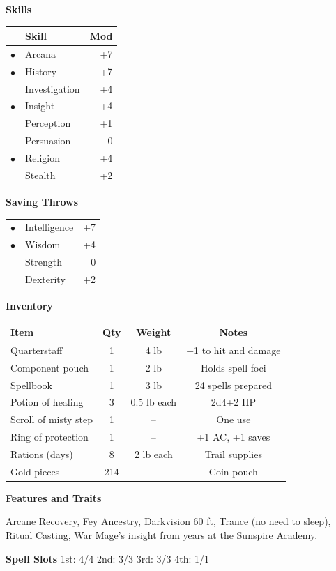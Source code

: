 \documentclass[9pt]{article}
\newcommand{\skillrow}[3]{#1 & #2 & #3 \\}
\begin{document}
\vspace{1.2em}
\noindent
\begin{minipage}[t]{0.36\textwidth}
{\large\bfseries\color{maroon} Skills}

\vspace{0.4em}
\begin{tabular}{@{}p{0.5cm}p{2.6cm}r@{}}
\toprule
& \textbf{Skill} & \textbf{Mod} \\
\midrule
\skillrow{$\bullet$}{Arcana}{+7}
\skillrow{$\bullet$}{History}{+7}
\skillrow{}{Investigation}{+4}
\skillrow{$\bullet$}{Insight}{+4}
\skillrow{}{Perception}{+1}
\skillrow{}{Persuasion}{0}
\skillrow{$\bullet$}{Religion}{+4}
\skillrow{}{Stealth}{+2}
\bottomrule
\end{tabular}

\vspace{0.8em}
{\large\bfseries\color{maroon} Saving Throws}

\vspace{0.4em}
\begin{tabular}{@{}p{0.5cm}p{2.6cm}r@{}}
\skillrow{$\bullet$}{Intelligence}{+7}
\skillrow{$\bullet$}{Wisdom}{+4}
\skillrow{}{Strength}{0}
\skillrow{}{Dexterity}{+2}
\end{tabular}
\end{minipage}%
\hfill
\begin{minipage}[t]{0.6\textwidth}
{\large\bfseries\color{maroon} Inventory}

\vspace{0.4em}
\begin{tabular}{@{}lccc@{}}
\toprule
\textbf{Item} & \textbf{Qty} & \textbf{Weight} & \textbf{Notes} \\
\midrule
Quarterstaff & 1 & 4 lb & +1 to hit and damage \\
Component pouch & 1 & 2 lb & Holds spell foci \\
Spellbook & 1 & 3 lb & 24 spells prepared \\
Potion of healing & 3 & 0.5 lb each & 2d4+2 HP \\
Scroll of misty step & 1 & -- & One use \\
Ring of protection & 1 & -- & +1 AC, +1 saves \\
Rations (days) & 8 & 2 lb each & Trail supplies \\
Gold pieces & 214 & -- & Coin pouch \\
\bottomrule
\end{tabular}

\vspace{0.8em}
{\large\bfseries\color{maroon} Features and Traits}

\vspace{0.4em}
Arcane Recovery, Fey Ancestry, Darkvision 60 ft, Trance (no need to sleep),
Ritual Casting, War Mage's insight from years at the Sunspire Academy.

\vspace{0.6em}
{\large\bfseries\color{maroon} Spell Slots}\quad
1st: 4/4 \quad 2nd: 3/3 \quad 3rd: 3/3 \quad 4th: 1/1
\end{minipage}
\end{document}
